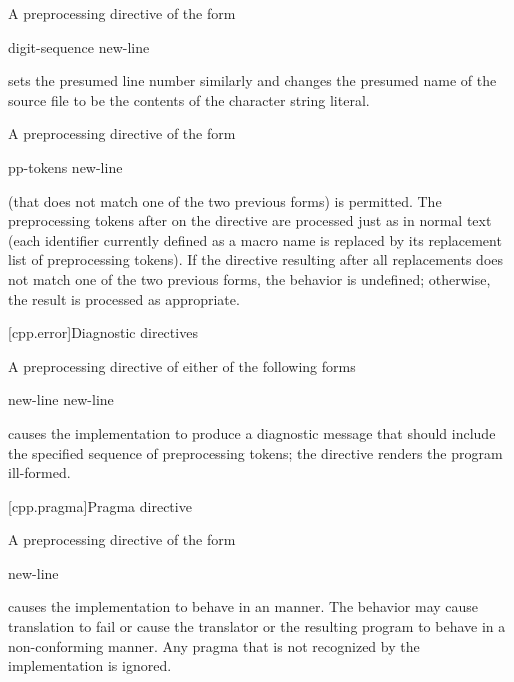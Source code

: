 \pnum
A preprocessing directive of the form
\begin{ncsimplebnf}
 digit-sequence    new-line
\end{ncsimplebnf}
sets the presumed line number similarly and changes the
presumed name of the source file to be the contents
of the character string literal.

\pnum
A preprocessing directive of the form
\begin{ncsimplebnf}
 pp-tokens new-line
\end{ncsimplebnf}
(that does not match one of the two previous forms)
is permitted.
The preprocessing tokens after
on the directive are processed just as in normal text
(each identifier currently defined as a macro name is replaced by its
replacement list of preprocessing tokens).
If the directive resulting after all replacements does not match
one of the two previous forms, the behavior is undefined;
otherwise, the result is processed as appropriate.

[cpp.error]{Diagnostic directives}%
%
%
%

\pnum
A preprocessing directive of either of the following forms
\begin{ncsimplebnf}
  new-line\br
{}  new-line
\end{ncsimplebnf}
causes the implementation to produce
a diagnostic message that should include the specified sequence of preprocessing tokens;
the  directive renders the program ill-formed.

[cpp.pragma]{Pragma directive}%
%

\pnum
A preprocessing directive of the form
\begin{ncsimplebnf}
  new-line
\end{ncsimplebnf}
causes the implementation to behave
in an  manner.
The behavior may cause translation to fail or cause the translator or
the resulting program to behave in a non-conforming manner.
Any pragma that is not recognized by the implementation is ignored.

